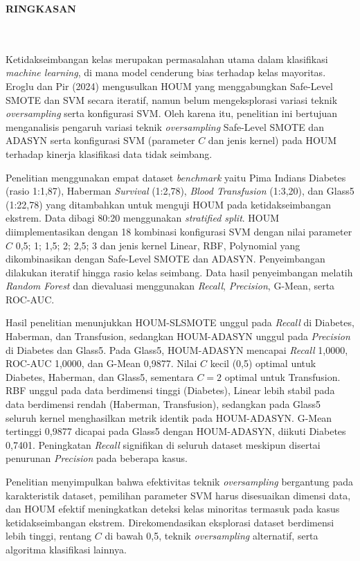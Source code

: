 \clearpage
{}%
\thispagestyle{fancy}

\begin{center}
	\large \bfseries \MakeUppercase{Ringkasan}\\
	\normalsize \normalfont {\thetitle}\\
	\normalsize \normalfont {\theauthor}\\
	\bigskip
	
	\normalsize \normalfont \justifying \singlespacing
Ketidakseimbangan kelas merupakan permasalahan utama dalam klasifikasi \textit{machine learning}, di mana model cenderung bias terhadap kelas mayoritas. Eroglu dan Pir (2024) mengusulkan HOUM yang menggabungkan Safe-Level SMOTE dan SVM secara iteratif, namun belum mengeksplorasi variasi teknik \textit{oversampling} serta konfigurasi SVM. Oleh karena itu, penelitian ini bertujuan menganalisis pengaruh variasi teknik \textit{oversampling} Safe-Level SMOTE dan ADASYN serta konfigurasi SVM (parameter $C$ dan jenis kernel) pada HOUM terhadap kinerja klasifikasi data tidak seimbang.

Penelitian menggunakan empat dataset \textit{benchmark} yaitu Pima Indians Diabetes (rasio 1:1,87), Haberman \textit{Survival} (1:2,78), \textit{Blood Transfusion} (1:3,20), dan Glass5 (1:22,78) yang ditambahkan untuk menguji HOUM pada ketidakseimbangan ekstrem. Data dibagi 80:20 menggunakan \textit{stratified split}. HOUM diimplementasikan dengan 18 kombinasi konfigurasi SVM dengan nilai parameter $C$ 0,5; 1; 1,5; 2; 2,5; 3 dan jenis kernel Linear, RBF, Polynomial yang dikombinasikan dengan Safe-Level SMOTE dan ADASYN. Penyeimbangan dilakukan iteratif hingga rasio kelas seimbang. Data hasil penyeimbangan melatih \textit{Random Forest} dan dievaluasi menggunakan \textit{Recall}, \textit{Precision}, G-Mean, serta ROC-AUC.

Hasil penelitian menunjukkan HOUM-SLSMOTE unggul pada \textit{Recall} di Diabetes, Haberman, dan Transfusion, sedangkan HOUM-ADASYN unggul pada \textit{Precision} di Diabetes dan Glass5. Pada Glass5, HOUM-ADASYN mencapai \textit{Recall} 1,0000, ROC-AUC 1,0000, dan G-Mean 0,9877. Nilai $C$ kecil (0,5) optimal untuk Diabetes, Haberman, dan Glass5, sementara $C=2$ optimal untuk Transfusion. RBF unggul pada data berdimensi tinggi (Diabetes), Linear lebih stabil pada data berdimensi rendah (Haberman, Transfusion), sedangkan pada Glass5 seluruh kernel menghasilkan metrik identik pada HOUM-ADASYN. G-Mean tertinggi 0,9877 dicapai pada Glass5 dengan HOUM-ADASYN, diikuti Diabetes 0,7401. Peningkatan \textit{Recall} signifikan di seluruh dataset meskipun disertai penurunan \textit{Precision} pada beberapa kasus.

Penelitian menyimpulkan bahwa efektivitas teknik \textit{oversampling} bergantung pada karakteristik dataset, pemilihan parameter SVM harus disesuaikan dimensi data, dan HOUM efektif meningkatkan deteksi kelas minoritas termasuk pada kasus ketidakseimbangan ekstrem. Direkomendasikan eksplorasi dataset berdimensi lebih tinggi, rentang $C$ di bawah 0,5, teknik \textit{oversampling} alternatif, serta algoritma klasifikasi lainnya.

	\vfill
	
\end{center}
\clearpage